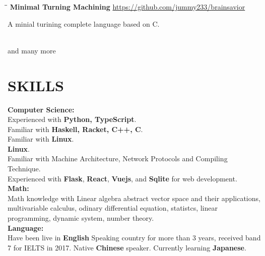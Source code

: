 \documentclass{res}
\begin{document}
\begin{resume}
    \vspace{-0.2in}
    \begin{tabbing}
        \hspace{2.3in}\= \hspace{0.3in}\= \kill
        {\bf Minimal Turning Machining} \>               \>\url{https://github.com/jummy233/brainsavior}\\
    \end{tabbing}\vspace{-33pt}
    A minial turining complete language based on C.

    \vspace{-0.01in}\\
    and many more

\section{SKILLS}
    \textbf{Computer Science:}
    \vspace{0.05in}\\
    {\large E}xperienced with \textbf{Python, TypeScript}. \\
    {\large F}amiliar with \textbf{Haskell, Racket, C++, C}. \\
    {\large F}amiliar with \textbf{Linux}. \\
    \textbf{Linux}. \\
    {\large F}amiliar with Machine Architecture, Network
    Protocols and Compiling Technique. \\
    {\large E}xperienced with \textbf{Flask}, \textbf{React}, \textbf{Vuejs}, and \textbf{Sqlite} for web development. \\
    \textbf{Math:}
    \vspace{0.05in}\\
    {\large M}ath knowledge with Linear algebra abstract vector space and their applications, multivariable calculus, odinary differential equation, statistcs, linear programming, dynamic system, number theory. \\
    \textbf{Language:}
    \vspace{0.05in}\\
    Have been live in \textbf{English} Speaking country for more than 3 years, received band 7 for IELTS in 2017. Native \textbf{Chinese} speaker. Currently learning
    \textbf{Japanese}.


\end{resume}
\end{document}

